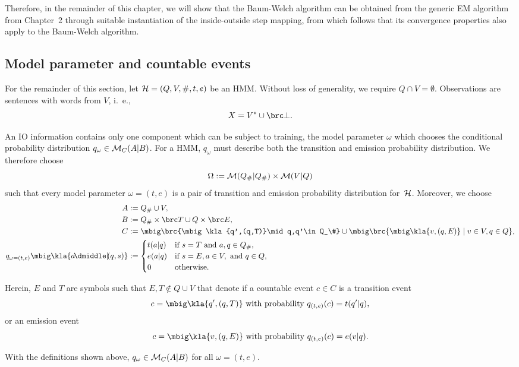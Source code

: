 Therefore, in the remainder of this chapter, we will show that the Baum-Welch
algorithm can be obtained from the generic EM algorithm from Chapter~2 through
suitable instantiation of the inside-outside step mapping, from which follows
that its convergence properties also apply to the Baum-Welch algorithm.

\subsection{Model parameter and countable events}

For the remainder of this section, let $\mathcal H = (Q,V,\#,t,e)$ be an HMM. Without
loss of generality, we require $Q\cap V=\emptyset$. Observations are sentences
with words from $V$, i.~e.,
\[
 X = V^* \cup\brc\bot. \label{eq:03-X}
\]

An IO information contains only one component which can be subject to training,
the model parameter $\omega$ which chooses the conditional probability
distribution $q_\omega \in \mathcal M_C(A|B)$.
For a HMM, $q_\omega$ must describe both the transition and emission
probability distribution. We therefore choose
\label{eq:03-omega}
\[
 \Omega := \mathcal M(Q_\#|Q_\#) \times\mathcal M(V|Q)
\]
such that every model parameter $\omega=(t,e)$ is a pair of transition and
emission probability distribution for~$\mathcal H$. Moreover, we choose
\label{eq:03-ABC}\begin{align*}
 A &:= Q_\#\cup V, \\
 B &:= Q_\# \times \brc T \cup Q \times \brc E, \\
 C &:= \mbig\brc{\mbig\kla{q',(q,T)}\mid q,q'\in Q_\#} \cup \mbig\brc{\mbig\kla{v,(q,E)}\mid v\in V, q\in Q}, \\
 q_{\omega=(t,e)}\mbig\kla{a\npipe(q,s)} &:= \begin{cases}
  t(a|q) & \text{if } s = T \text{ and } a,q\in Q_\#, \\
  e(a|q) & \text{if } s = E, a\in V\!, \text{ and } q \in Q, \\
  0 & \text{otherwise}.
 \end{cases}
\end{align*}

Herein, $E$ and $T$ are symbols such that $E,T\notin Q\cup V$ that denote if a
countable event $c\in C$ is a transition event
\[
 c = \mbig\kla{q',(q,T)} \text{ with probability } q_{(t,e)}(c) = t(q'|q),
\]
or an emission event
\[
 c = \mbig\kla{v,(q,E)} \text{ with probability } q_{(t,e)}(c) = e(v|q).
\]

\begin{lemma}
 With the definitions shown above, $q_\omega\in\mathcal M_C(A|B)$ for all $\omega=(t,e)$.
\end{lemma}

